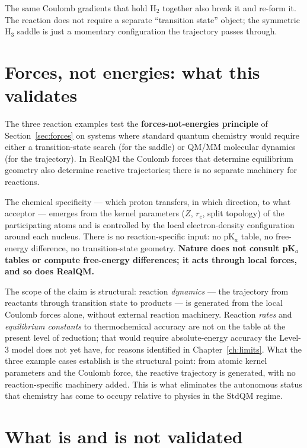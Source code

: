 The same Coulomb gradients that hold H$_2$ together also break it and re-form it. The reaction does not require a separate ``transition state'' object; the symmetric H$_3$ saddle is just a momentary configuration the trajectory passes through.

\section{Forces, not energies: what this validates}\label{sec:forces-not-energies}

The three reaction examples test the \textbf{forces-not-energies principle} of Section~\ref{sec:forces} on systems where standard quantum chemistry would require either a transition-state search (for the saddle) or QM/MM molecular dynamics (for the trajectory). In RealQM the Coulomb forces that determine equilibrium geometry also determine reactive trajectories; there is no separate machinery for reactions.

The chemical specificity --- which proton transfers, in which direction, to what acceptor --- emerges from the kernel parameters ($Z$, $r_c$, split topology) of the participating atoms and is controlled by the local electron-density configuration around each nucleus. There is no reaction-specific input: no pK$_a$ table, no free-energy difference, no transition-state geometry. \textbf{Nature does not consult pK$_a$ tables or compute free-energy differences; it acts through local forces, and so does RealQM.}

The scope of the claim is structural: reaction \emph{dynamics} --- the trajectory from reactants through transition state to products --- is generated from the local Coulomb forces alone, without external reaction machinery. Reaction \emph{rates} and \emph{equilibrium constants} to thermochemical accuracy are not on the table at the present level of reduction; that would require absolute-energy accuracy the Level-3 model does not yet have, for reasons identified in Chapter~\ref{ch:limits}. What the three example cases establish is the structural point: from atomic kernel parameters and the Coulomb force, the reactive trajectory is generated, with no reaction-specific machinery added. This is what eliminates the autonomous status that chemistry has come to occupy relative to physics in the StdQM regime.

\section{What is and is not validated}\label{sec:dimer-summary}

